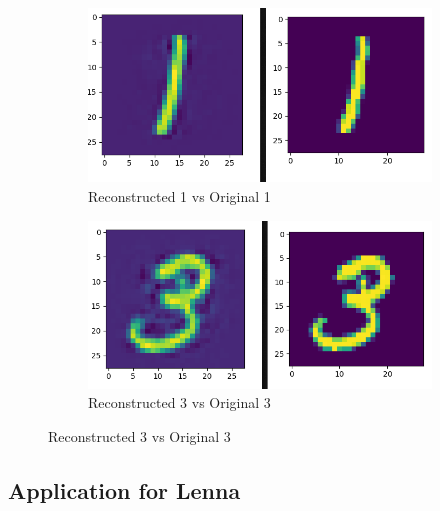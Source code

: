 \documentclass[a4paper,10pt]{article}
\begin{document}
  \begin{figure}[h]
 \begin{subfigure}{.5\textwidth}
 \centering
 \includegraphics[scale=0.4]{Results/SPAMS_X_ALL_K_2048/recons1.png}
  \caption{Reconstructed 1 vs Original 1}
 \end{subfigure}%
  \begin{subfigure}{.3\textwidth}
 \centering
 \includegraphics[scale=0.39]{Results/SPAMS_X_ALL_K_2048/recons3.png}
  \caption{Reconstructed 3 vs Original 3}

 \end{subfigure}%
\end{figure}

\newpage
\subsection{Application for Lenna}
\end{document}

